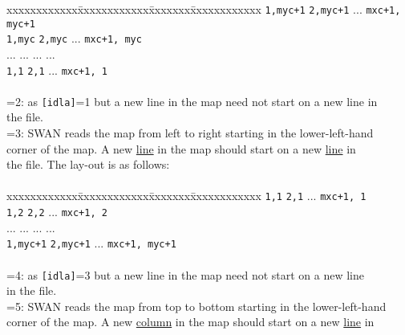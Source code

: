 \documentclass[12pt]{book}
\begin{document}
\begin{tabbing}
                              xxxxxxxxxxxx\=xxxxxxxxxxxx\=xxxxxxx\=xxxxxxxxxxxx \kill
                              {\tt 1,myc+1} \> {\tt 2,myc+1} \> ... \> {\tt mxc+1, myc+1} \\
                              {\tt 1,myc}   \> {\tt 2,myc}   \> ... \> {\tt mxc+1, myc} \\
                              ...           \> ...           \> ... \> ...              \\
                              {\tt 1,1} \> {\tt 2,1} \> ... \> {\tt mxc+1, 1} \\
                              \poptabs
                              \-\\
                       =2: \> as {\tt [idla]}=1 but a new line in the map need not start on a new line in\+\\
                              the file.\-\\
                       =3: \> SWAN reads the map from left to right starting in the lower-left-hand\+\\
                              corner of the map. A new \underline{line} in the map should start on a new \underline{line} in\\
                              the file. The lay-out is as follows:\\
                              \\
                              \pushtabs
                              xxxxxxxxxxxx\=xxxxxxxxxxxx\=xxxxxxx\=xxxxxxxxxxxx \kill
                              {\tt 1,1} \> {\tt 2,1} \> ... \> {\tt mxc+1, 1} \\
                              {\tt 1,2} \> {\tt 2,2} \> ... \> {\tt mxc+1, 2} \\
                              ...           \> ...           \> ... \> ...              \\
                              {\tt 1,myc+1} \> {\tt 2,myc+1} \> ... \> {\tt mxc+1, myc+1} \\
                              \poptabs
                              \-\\
                       =4: \> as {\tt [idla]}=3 but a new line in the map need not start on a new line\+\\
                              in the file.\-\\
                       =5: \> SWAN reads the map from top to bottom starting in the lower-left-hand\+\\
                              corner of the map. A new \underline{column} in the map should start on a new \underline{line} in\\

\end{tabbing}
\end{document}
